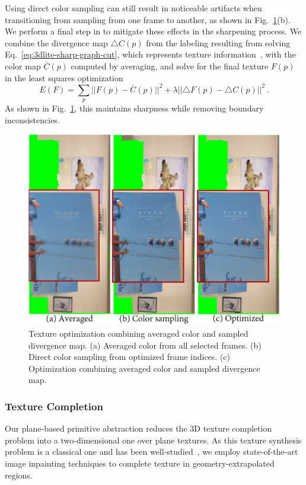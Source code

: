 Using direct color sampling can still result in noticeable artifacts when transitioning from sampling from one frame to another, as shown in Fig.~\ref{fig:3dlite-sharp-poisson}(b).
We perform a final step in to mitigate these effects in the sharpening process.
We combine the divergence map $\triangle C(p)$ from the labeling resulting from solving Eq.~\ref{eq:3dlite-sharp-graph-cut}, which represents texture information~\cite{perez2003poisson}, with the color map $\bar{C}(p)$ computed by averaging, and solve for the final texture $F(p)$ in the least squares optimization
\begin{equation}
E(F) = \sum_p ||F(p) - \bar{C}(p)||^2 + \lambda ||\triangle F(p) - \triangle C(p)||^2\,.
\label{eq:sharp-poisson}
\end{equation}
As shown in Fig.~\ref{fig:3dlite-sharp-poisson}, this maintains sharpness while removing boundary inconsistencies.

\begin{figure}
\centering
\includegraphics[width=0.8\linewidth]{3dlite/fig6.png}
\caption{Texture optimization combining averaged color and sampled divergence map. (a) Averaged color from all selected frames. (b) Direct color sampling from optimized frame indices. (c) Optimization combining averaged color and sampled divergence map.}
\label{fig:3dlite-sharp-poisson}
\end{figure}

\subsubsection{Texture Completion}
\label{subsec:3dlite-inpaint}
Our plane-based primitive abstraction reduces the 3D texture completion problem into a two-dimensional one over plane textures.
As this texture synthesis problem is a classical one and has been well-studied~\cite{criminisi2004region,simakov2008summarizing,barnes2009patchmatch,darabi2012image,wang2016unsupervised,pathak2016context,yang2016high}, we employ state-of-the-art image inpainting techniques to complete texture in geometry-extrapolated regions.

